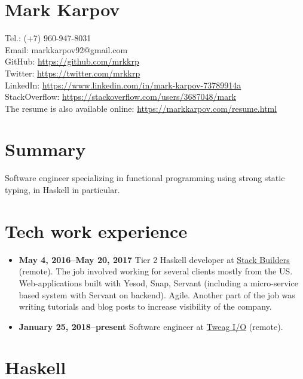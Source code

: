 \documentclass[a4paper,12pt]{article}
\begin{document}
\section*{Mark Karpov}

Tel.: (+7) 960-947-8031\\
Email: markkarpov92@gmail.com\\
GitHub: \href{https://github.com/mrkkrp}{https://github.com/mrkkrp}\\
Twitter: \href{https://twitter.com/mrkkrp}{https://twitter.com/mrkkrp}\\
LinkedIn: \href{https://www.linkedin.com/in/mark-karpov-73789914a}{https://www.linkedin.com/in/mark-karpov-73789914a}\\
StackOverflow: \href{https://stackoverflow.com/users/3687048/mark}{https://stackoverflow.com/users/3687048/mark}\\
The resume is also available online: \href{https://markkarpov.com/resume.html}{https://markkarpov.com/resume.html}

\sectionfont{\fontsize{12}{15}\selectfont\sectionrule{0pt}{0pt}{-5pt}{0.8pt}}

\section*{Summary}

Software engineer specializing in functional programming using strong static
typing, in Haskell in particular.

\section*{Tech work experience}

\begin{itemize}[noitemsep]
\item \textbf{May 4, 2016--May 20, 2017} Tier 2 Haskell developer at
  \href{https://www.stackbuilders.com/}{Stack Builders} (remote). The job
  involved working for several clients mostly from the US. Web-applications
  built with Yesod, Snap, Servant (including a micro-service based system
  with Servant on backend). Agile. Another part of the job was writing
  tutorials and blog posts to increase visibility of the company.
\item \textbf{January 25, 2018--present} Software engineer at
  \href{https://tweag.io}{Tweag I/O} (remote).
\end{itemize}

\section*{Haskell}
\end{document}
